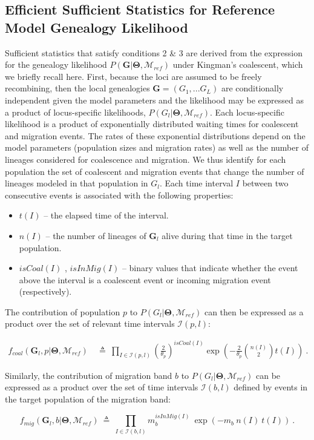 \documentclass[11pt]{article}
\newcommand{\vect}[1]{\boldsymbol{\mathbf{#1}}}
\newcommand{\M}{\mathcal{M}}
\newcommand{\G}{\vect{G}}
\newcommand{\T}{\vect{\Theta}}
\newcommand{\Ip}{\mathcal{I}(p,l)}
\newcommand{\Ib}{\mathcal{I}(b,l)}
\newcommand{\Mref}{\M_{ref}}
\newcommand{\1}{\mathbbm{1}}
\begin{document}
\subsection{Efficient Sufficient Statistics for Reference Model Genealogy Likelihood}
\label{sec:Efficient Sufficient Statistics for Reference Model Genealogy Likelihood}

Sufficient statistics that satisfy conditions 2 \& 3 are derived from the expression for the genealogy likelihood $P(\G|\T, \Mref)$ under Kingman's coalescent, which we briefly recall here.
First, because the loci are assumed to be freely recombining, then the local genealogies $\G=(G_1,...G_L)$ are conditionally independent given the model parameters and the likelihood may be expressed as a product of locus-specific likelihoods, $P(G_l|\T,\Mref)$.  Each locus-specific likelihood is a product of exponentially distributed waiting times for coalescent and migration events. The rates of these exponential distributions depend on the model parameters (population sizes and migration rates) as well as the number of lineages considered for coalescence and migration. We thus identify for each population the set of coalescent and migration events that change the number of lineages modeled in that population in $G_l$. Each time interval $I$ between two consecutive events is associated with the following properties:
\begin{itemize}
 \item $t(I)$ -- the elapsed time of the interval.
 \item $n(I)$ -- the number of lineages of $\G_l$ alive during that time in the target population.
 \item $isCoal(I)$ , $isInMig(I)$  -- binary values that indicate whether the event above the interval is a coalescent event or incoming migration event (respectively).
\end{itemize}
%
%
The contribution of population $p$ to $P(G_l|\T,\Mref)$ can then be expressed as a product over the set of relevant time intervals $\Ip$:
%
%
\begin{small}
\begin{align}
f_{coal}(\G_l,p|\T,\Mref) 
& ~\triangleq~ \prod_{I \in \Ip} \left(\frac{2}{\theta_p}\right)^{isCoal(I)} \exp\left(-\frac{2}{\theta_p}{n(I) \choose 2}t(I)\right) ~. %
\label{eqn:ld-coal}
\end{align}
\end{small}
%
%
Similarly, the contribution of migration band $b$ to $P(G_l|\T,\Mref)$ can be expressed as a product over the set of time intervals $\Ib$ defined by events in the target population of the migration band:
%
%
\begin{small}
\begin{equation}
f_{mig}(\G_l,b|\T,\Mref) ~\triangleq~ \prod_{I \in \Ib} m_{b}^{isInMig(I)} ~ \exp \left( - m_b~ n(I)~t(I)\right) ~.
\label{eqn:ld-mig}
\end{equation}
\end{small}
%
%
\end{document}
